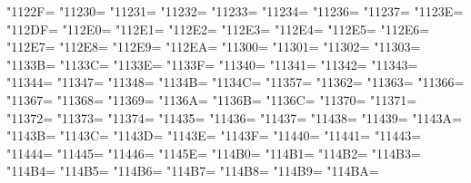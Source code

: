 \XeTeXcharclass"1122F=\KclassCM
\XeTeXcharclass"11230=\KclassCM
\XeTeXcharclass"11231=\KclassCM
\XeTeXcharclass"11232=\KclassCM
\XeTeXcharclass"11233=\KclassCM
\XeTeXcharclass"11234=\KclassCM
\XeTeXcharclass"11236=\KclassCM
\XeTeXcharclass"11237=\KclassCM
\XeTeXcharclass"1123E=\KclassCM
\XeTeXcharclass"112DF=\KclassCM
\XeTeXcharclass"112E0=\KclassCM
\XeTeXcharclass"112E1=\KclassCM
\XeTeXcharclass"112E2=\KclassCM
\XeTeXcharclass"112E3=\KclassCM
\XeTeXcharclass"112E4=\KclassCM
\XeTeXcharclass"112E5=\KclassCM
\XeTeXcharclass"112E6=\KclassCM
\XeTeXcharclass"112E7=\KclassCM
\XeTeXcharclass"112E8=\KclassCM
\XeTeXcharclass"112E9=\KclassCM
\XeTeXcharclass"112EA=\KclassCM
\XeTeXcharclass"11300=\KclassCM
\XeTeXcharclass"11301=\KclassCM
\XeTeXcharclass"11302=\KclassCM
\XeTeXcharclass"11303=\KclassCM
\XeTeXcharclass"1133B=\KclassCM
\XeTeXcharclass"1133C=\KclassCM
\XeTeXcharclass"1133E=\KclassCM
\XeTeXcharclass"1133F=\KclassCM
\XeTeXcharclass"11340=\KclassCM
\XeTeXcharclass"11341=\KclassCM
\XeTeXcharclass"11342=\KclassCM
\XeTeXcharclass"11343=\KclassCM
\XeTeXcharclass"11344=\KclassCM
\XeTeXcharclass"11347=\KclassCM
\XeTeXcharclass"11348=\KclassCM
\XeTeXcharclass"1134B=\KclassCM
\XeTeXcharclass"1134C=\KclassCM
\XeTeXcharclass"11357=\KclassCM
\XeTeXcharclass"11362=\KclassCM
\XeTeXcharclass"11363=\KclassCM
\XeTeXcharclass"11366=\KclassCM
\XeTeXcharclass"11367=\KclassCM
\XeTeXcharclass"11368=\KclassCM
\XeTeXcharclass"11369=\KclassCM
\XeTeXcharclass"1136A=\KclassCM
\XeTeXcharclass"1136B=\KclassCM
\XeTeXcharclass"1136C=\KclassCM
\XeTeXcharclass"11370=\KclassCM
\XeTeXcharclass"11371=\KclassCM
\XeTeXcharclass"11372=\KclassCM
\XeTeXcharclass"11373=\KclassCM
\XeTeXcharclass"11374=\KclassCM
\XeTeXcharclass"11435=\KclassCM
\XeTeXcharclass"11436=\KclassCM
\XeTeXcharclass"11437=\KclassCM
\XeTeXcharclass"11438=\KclassCM
\XeTeXcharclass"11439=\KclassCM
\XeTeXcharclass"1143A=\KclassCM
\XeTeXcharclass"1143B=\KclassCM
\XeTeXcharclass"1143C=\KclassCM
\XeTeXcharclass"1143D=\KclassCM
\XeTeXcharclass"1143E=\KclassCM
\XeTeXcharclass"1143F=\KclassCM
\XeTeXcharclass"11440=\KclassCM
\XeTeXcharclass"11441=\KclassCM
\XeTeXcharclass"11443=\KclassCM
\XeTeXcharclass"11444=\KclassCM
\XeTeXcharclass"11445=\KclassCM
\XeTeXcharclass"11446=\KclassCM
\XeTeXcharclass"1145E=\KclassCM
\XeTeXcharclass"114B0=\KclassCM
\XeTeXcharclass"114B1=\KclassCM
\XeTeXcharclass"114B2=\KclassCM
\XeTeXcharclass"114B3=\KclassCM
\XeTeXcharclass"114B4=\KclassCM
\XeTeXcharclass"114B5=\KclassCM
\XeTeXcharclass"114B6=\KclassCM
\XeTeXcharclass"114B7=\KclassCM
\XeTeXcharclass"114B8=\KclassCM
\XeTeXcharclass"114B9=\KclassCM
\XeTeXcharclass"114BA=\KclassCM
